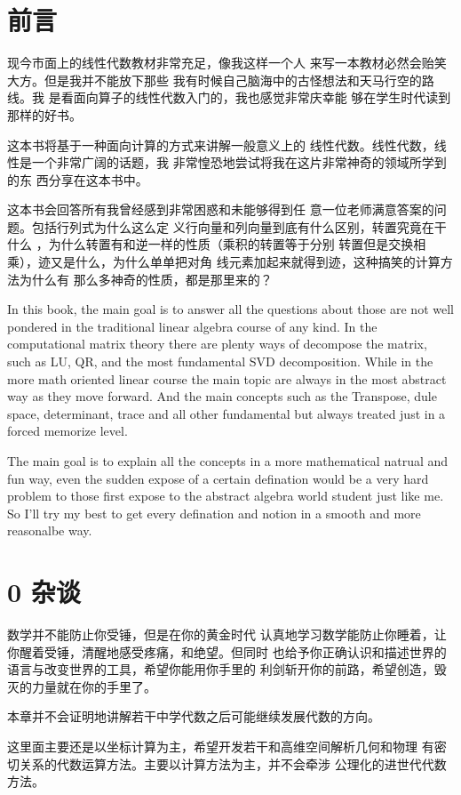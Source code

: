 \documentclass{book}
\renewcommand{\contentsname}{Table of Contents} %
\newcommand{\prefacePara}
{
现今市面上的线性代数教材非常充足，像我这样一个人
来写一本教材必然会贻笑大方。但是我并不能放下那些
我有时候自己脑海中的古怪想法和天马行空的路线。我
是看面向算子的线性代数入门的，我也感觉非常庆幸能
够在学生时代读到那样的好书。

这本书将基于一种面向计算的方式来讲解一般意义上的
线性代数。线性代数，线性是一个非常广阔的话题，我
非常惶恐地尝试将我在这片非常神奇的领域所学到的东
西分享在这本书中。

这本书会回答所有我曾经感到非常困惑和未能够得到任
意一位老师满意答案的问题。包括行列式为什么这么定
义行向量和列向量到底有什么区别，转置究竟在干什么
，为什么转置有和逆一样的性质（乘积的转置等于分别
转置但是交换相乘），迹又是什么，为什么单单把对角
线元素加起来就得到迹，这种搞笑的计算方法为什么有
那么多神奇的性质，都是那里来的？

In this book, the main goal is to answer all the
questions about those are not well pondered in the
traditional linear algebra course of any kind.
In the computational matrix theory there are plenty
ways of decompose the matrix, such as LU, QR, and the
most fundamental SVD decomposition.
While in the more math oriented linear course
the main topic are always in the most abstract way
as they move forward.
And the main concepts such as the Transpose, dule
space, determinant, trace and all other fundamental
but always treated just in a forced memorize level.

The main goal is to explain all the concepts in a 
more mathematical natrual and fun way, even the sudden
expose of a certain defination would be a very hard
problem to those first expose to the abstract algebra
world student just like me. So I'll try my best to
get every defination and notion in a smooth and more
reasonalbe way. 
}
\begin{document}
\begin{CJK}{UTF8}{gbsn}
    \addtocounter{page}{2}

    \chapter{前言}
    \prefacePara{}

    \setcounter{tocdepth}{3}
    \renewcommand{\contentsname}{目录}
    \tableofcontents

    \mainmatter

    \chapter{0 杂谈}



    数学并不能防止你受锤，但是在你的黄金时代
    认真地学习数学能防止你睡着，让你醒着受锤，清醒地感受疼痛，和绝望。但同时
    也给予你正确认识和描述世界的语言与改变世界的工具，希望你能用你手里的
    利剑斩开你的前路，希望创造，毁灭的力量就在你的手里了。

    本章并不会证明地讲解若干中学代数之后可能继续发展代数的方向。

    这里面主要还是以坐标计算为主，希望开发若干和高维空间解析几何和物理
    有密切关系的代数运算方法。主要以计算方法为主，并不会牵涉
    公理化的进世代代数方法。


\end{CJK}
\end{document}
